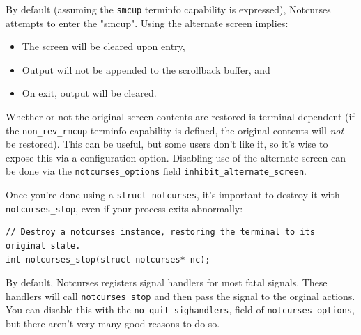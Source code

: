 \documentclass[letterpaper,10pt]{article}
\newenvironment{denseitemize}{
  \begin{itemize}
      \setlength{\itemsep}{0pt}
}{
  \end{itemize}
}
\begin{document}
By default (assuming the \texttt{smcup} terminfo capability is expressed),
Notcurses attempts to enter the "\gls{smcup}". Using the alternate screen
implies:
\begin{denseitemize}
\item{The screen will be cleared upon entry,}
\item{Output will not be appended to the scrollback buffer, and}
\item{On exit, output will be cleared.}
\end{denseitemize}
Whether or not the original screen contents are restored is terminal-dependent
(if the \texttt{non\_rev\_rmcup} terminfo capability is defined, the original
contents will \textit{not} be restored). This can be useful, but some users
don't like it, so it's wise to expose this via a configuration option.
Disabling use of the alternate screen can be done via the
\texttt{notcurses\_options} field \texttt{inhibit\_alternate\_screen}.

Once you're done using a \texttt{struct notcurses}, it's important to destroy
it with \texttt{notcurses\_stop}, even if your process exits abnormally:

\begin{listing}[ht]
\begin{verbatim}
// Destroy a notcurses instance, restoring the terminal to its original state.
int notcurses_stop(struct notcurses* nc);
\end{verbatim}
\end{listing}

By default, Notcurses registers signal handlers for most fatal signals. These
handlers will call \texttt{notcurses\_stop} and then pass the signal to the
orginal actions. You can disable this with the \texttt{no\_quit\_sighandlers},
field of \texttt{notcurses\_options}, but
there aren't very many good reasons to do so.
\end{document}
